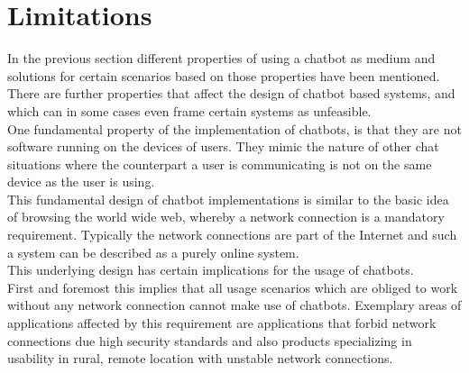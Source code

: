 \section{Limitations}


In the previous section different properties of using a chatbot as medium
and solutions for certain scenarios based on those properties have been mentioned.
\\

There are further properties that affect the design of chatbot based systems,
and which can in some cases even frame certain systems as unfeasible.
\\

One fundamental property of the implementation of chatbots,
is that they are not software running on the devices of users.
They mimic the nature of other chat situations where the counterpart
a user is communicating is not on the same device as the user is using.
\\
This fundamental design of chatbot implementations is similar to the basic
idea of browsing the world wide web, whereby a network connection is a mandatory requirement.
Typically the network connections are part of the Internet
and such a system can be described as a purely online system.
\\
This underlying design has certain implications for the usage of chatbots.
\\

First and foremost this implies that all usage scenarios which are obliged to work without any network connection
cannot make use of chatbots.
Exemplary areas of applications affected by this requirement are
applications that forbid network connections due high security standards
and also products specializing in usability in rural, remote location with unstable network connections.
\\

